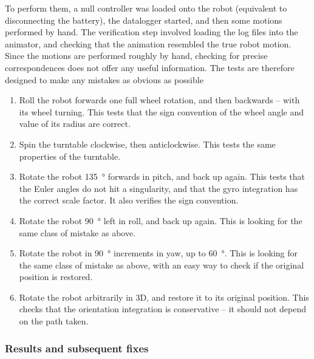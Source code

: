 \documentclass[main.tex]{subfiles}
\begin{document}
		To perform them, a null controller was loaded onto the robot (equivalent to disconnecting the battery), the datalogger started, and then some motions performed by hand.
		The verification step involved loading the log files into the animator, and checking that the animation resembled the true robot motion.
		Since the motions are performed roughly by hand, checking for precise correspondences does not offer any useful information.
		The tests are therefore designed to make any mistakes as obvious as possible

		\begin{enumerate}
			\item \label{sensor-test-wheel}
				Roll the robot forwards one full wheel rotation, and then backwards -- with its wheel turning.
				This tests that the sign convention of the wheel angle and value of its radius are correct.

			\item \label{sensor-test-tt}
				Spin the turntable clockwise, then anticlockwise.
				This tests the same properties of the turntable.

			\item \label{sensor-test-pitch}
				Rotate the robot \SI{135}{\degree} forwards in pitch, and back up again.
				This tests that the Euler angles do not hit a singularity, and that the gyro integration has the correct scale factor.
				It also verifies the sign convention.

			\item \label{sensor-test-roll}

			    Rotate the robot \SI{90}{\degree} left in roll, and back up again.
			    This is looking for the same class of mistake as above.

			\item \label{sensor-test-yaw}
				Rotate the robot in \SI{90}{\degree} increments in yaw, up to \SI{60}{\degree}.
			    This is looking for the same class of mistake as above, with an easy way to check if the original position is restored.

			\item \label{sensor-test-free}
			    Rotate the robot arbitrarily in 3D, and restore it to its original position.
			    This checks that the orientation integration is conservative -- it should not depend on the path taken.
		\end{enumerate}

		\subsubsection{Results and subsequent fixes}
\end{document}
